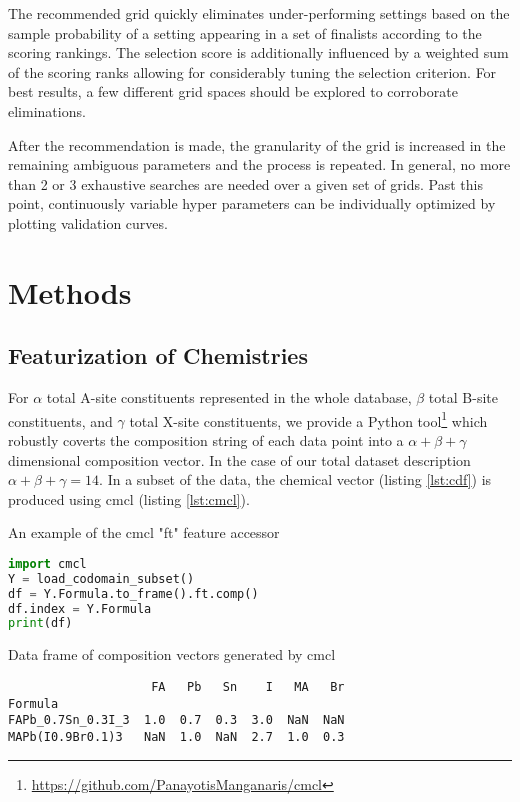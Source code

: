 The recommended grid quickly eliminates under-performing settings based on the sample probability of a setting appearing in a set of finalists according to the scoring rankings.
The selection score is additionally influenced by a weighted sum of the scoring ranks allowing for considerably tuning the selection criterion.
 For best results, a few different grid spaces should be explored to corroborate eliminations.

After the recommendation is made, the granularity of the grid is increased in the remaining ambiguous parameters and the process is repeated.
In general, no more than 2 or 3 exhaustive searches are needed over a given set of grids.
Past this point, continuously variable hyper parameters can be individually optimized by plotting validation curves.

\section{Methods}
\label{sec:org8021f91}
\subsection{Featurization of Chemistries}
\label{sec:orgbe74a5d}
For \(\alpha\) total A-site constituents represented in the whole database, \(\beta\) total B-site constituents, and \(\gamma\) total X-site constituents, we provide a Python tool\footnote{\url{https://github.com/PanayotisManganaris/cmcl}\label{orgc715886}} which robustly coverts the composition string of each data point into a \(\alpha + \beta + \gamma\) dimensional composition vector.
In the case of our total dataset description \(\alpha + \beta + \gamma = 14\).
\autocite{yang-2022-high-throug}
In a subset of the data, the chemical vector (listing \ref{lst:cdf}) is produced using cmcl (listing \ref{lst:cmcl}).

\begin{ZZlisting}
  \caption{\label{lst:cmcl} An example of the cmcl "ft" feature accessor}
  \begin{CenteredBox}
    \begin{lstlisting}[language=python]
import cmcl
Y = load_codomain_subset()
df = Y.Formula.to_frame().ft.comp()
df.index = Y.Formula
print(df)
    \end{lstlisting}
  \end{CenteredBox}
\end{ZZlisting}

\begin{ZZlisting}
  \caption{\label{lst:cdf} Data frame of composition vectors generated by cmcl}
  \begin{CenteredBox}
    \begin{lstlisting}
                    FA   Pb   Sn    I   MA   Br
Formula                                        
FAPb_0.7Sn_0.3I_3  1.0  0.7  0.3  3.0  NaN  NaN
MAPb(I0.9Br0.1)3   NaN  1.0  NaN  2.7  1.0  0.3
    \end{lstlisting}
  \end{CenteredBox}
\end{ZZlisting}

